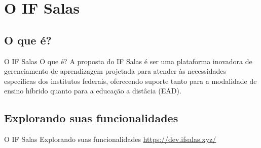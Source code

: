 \AtBeginSection[]{
	\begin{frame}
		\frametitle{}
		\tableofcontents[currentsection]
	\end{frame}
}

\section{O IF Salas}

\subsection{O que é?}
\begin{frame}{O IF Salas}
	{O que é?}
	A proposta do IF Salas é ser uma plataforma inovadora de gerenciamento de aprendizagem projetada 
	para atender às necessidades específicas dos institutos federais, oferecendo suporte tanto para a 
	modalidade de ensino híbrido quanto para a educação a distâcia (EAD).
\end{frame}

\subsection{Explorando suas funcionalidades}
\begin{frame}{O IF Salas}
	{Explorando suas funcionalidades}
	\centering
	\href{https://dev.ifsalas.xyz/}{https://dev.ifsalas.xyz/}
\end{frame}